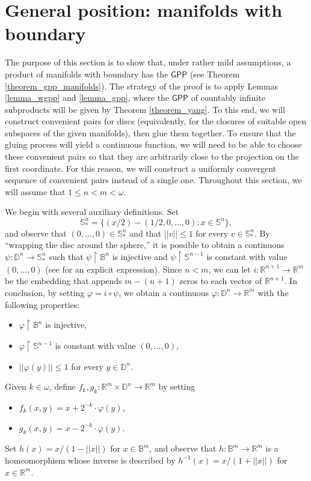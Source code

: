 \documentclass{amsart}
\theoremstyle{plain}
\theoremstyle{definition}
\newcommand{\re}{\upharpoonright}
\newcommand{\GPP}{\mathsf{GPP}}
\newcommand{\BBB}{\mathbb{B}}
\newcommand{\DDD}{\mathbb{D}}
\newcommand{\RRR}{\mathbb{R}}
\newcommand{\SSS}{\mathbb{S}}
\begin{document}
\section{General position: manifolds with boundary}\label{section_manifolds}

The purpose of this section is to show that, under rather mild assumptions, a product of manifolds with boundary has the $\GPP$ (see Theorem \ref{theorem_gpp_manifolds}). The strategy of the proof is to apply Lemmas \ref{lemma_wgpp} and \ref{lemma_gpp}, where the $\GPP$ of countably infinite subproducts will be given by Theorem \ref{theorem_yang}. To this end, we will construct convenient pairs for discs (equivalently, for the closures of suitable open subspaces of the given manifolds), then glue them together. To ensure that the gluing process will yield a continuous function, we will need to be able to choose these convenient pairs so that they are arbitrarily close to the projection on the first coordinate. For this reason, we will construct a uniformly convergent sequence of convenient pairs instead of a single one. Throughout this section, we will assume that $1\leq n<m<\omega$.

We begin with several auxiliary definitions. Set
$$
\SSS^n_\ast=\{(x/2)-(1/2,0,\ldots,0):x\in\SSS^n\},
$$
and observe that $(0,\ldots,0)\in\SSS^n_\ast$ and that $||v||\leq 1$ for every $v\in\SSS^n_\ast$. By ``wrapping the disc around the sphere,'' it is possible to obtain a continuous $\psi:\DDD^n\longrightarrow\SSS^n_\ast$ such that $\psi\re\BBB^n$ is injective and $\psi\re\SSS^{n-1}$ is constant with value $(0,\ldots,0)$ (see \cite[Example 7.1.7]{singh} for an explicit expression). Since $n<m$, we can let $i:\RRR^{n+1}\longrightarrow\RRR^m$ be the embedding that appends $m-(n+1)$ zeros to each vector of $\RRR^{n+1}$. In conclusion, by setting $\varphi=i\circ\psi$, we obtain a continuous $\varphi:\DDD^n\longrightarrow\RRR^m$ with the following properties:
\begin{itemize}
\item $\varphi\re\BBB^n$ is injective,
\item $\varphi\re\SSS^{n-1}$ is constant with value $(0,\ldots,0)$,
\item $||\varphi(y)||\leq 1$ for every $y\in\DDD^n$.
\end{itemize}

Given $k\in\omega$, define $f_k,g_k:\RRR^m\times\DDD^n\longrightarrow\RRR^m$ by setting
\begin{itemize}
\item $f_k(x,y)=x+2^{-k}\cdot\varphi(y)$,
\item $g_k(x,y)=x-2^{-k}\cdot\varphi(y)$.
\end{itemize}
Set $h(x)=x/(1-||x||)$ for $x\in\BBB^m$, and observe that $h:\BBB^m\longrightarrow\RRR^m$ is a homeomorphism whose inverse is described by $h^{-1}(x)=x/(1+||x||)$ for $x\in\RRR^m$.
\end{document}
